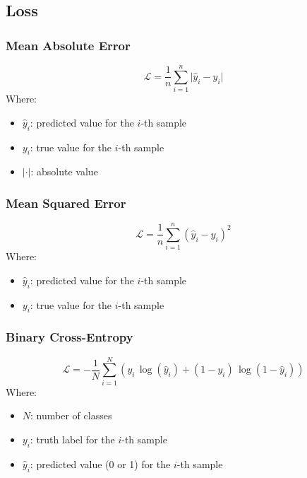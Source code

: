 \documentclass[a4paper]{report}
\newcommand{\abs}[1]{\lvert#1\rvert}
\newcommand{\haty}{\hat{y}}
\newcommand{\ELL}{\mathcal{L}}
\begin{document}
\subsection{Loss}
\subsubsection*{Mean Absolute Error}
\begin{equation*}
    \ELL = \frac{1}{n} \sum_{i=1}^{n} \abs{\haty_i - y_i}
\end{equation*}
Where:
\begin{itemize}
    \item $\haty_i$: predicted value for the $i$-th sample
    \item $y_i$: true value for the $i$-th sample
    \item $\abs{\cdot}$: absolute value
\end{itemize}

\subsubsection*{Mean Squared Error}
\begin{equation*}
    \ELL = \frac{1}{n} \sum_{i=1}^{n} (\haty_i - y_i)^2
\end{equation*}
Where:
\begin{itemize}
    \item $\haty_i$: predicted value for the $i$-th sample
    \item $y_i$: true value for the $i$-th sample
\end{itemize}

\subsubsection*{Binary Cross-Entropy}
\begin{equation*}
    \ELL = -\frac{1}{N} \sum_{i=1}^{N} (y_i \, \log(\haty_i) + (1-y_i) \, \log(1-\haty_i))
\end{equation*}
Where:
\begin{itemize}
    \item $N$: number of classes
    \item $y_i$: truth label for the $i$-th sample
    \item $\haty_i$: predicted value (0 or 1) for the $i$-th sample
\end{itemize}
\end{document}
